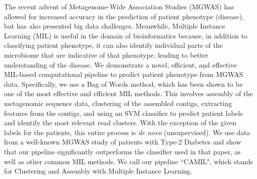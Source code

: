 
The recent advent of Metagenome-Wide Association Studies (MGWAS) has allowed for increased accuracy in the prediction of patient phenotype (disease), but has also presented big data challenges. Meanwhile, Multiple Instance Learning (MIL) is useful in the domain of bioinformatics because, in addition to classifying patient phenotype, it can also identify individual parts of the microbiome that are indicative of that phenotype, leading to better understanding of the disease. We demonstrate a novel, efficient, and effective MIL-based computational pipeline to predict patient phenotype from MGWAS data. Specifically, we use a Bag of Words method, which has been shown to be one of the most effective and efficient MIL methods. This involves assembly of the metagenomic sequence data, clustering of the assembled contigs, extracting features from the contigs, and using an SVM classifier to predict patient labels and identify the most relevant read clusters. With the exception of the given labels for the patients, this entire process is \emph{de novo} (unsupervised). We use data from a well-known MGWAS study of patients with Type-2 Diabetes and show that our pipeline significantly outperforms the classifier used in that paper, as well as other common MIL methods. We call our pipeline ``CAMIL", which stands for Clustering and Assembly with Multiple Instance Learning.
